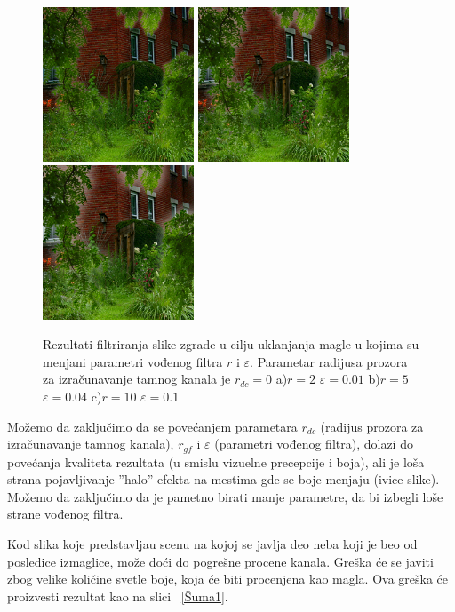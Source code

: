 \documentclass[a4paper,12pt,titlepage]{article}
\begin{document}
\begin{figure}[ht!]
\centering
\includegraphics[width=45mm]{img/hazeResGF2_01.png}
\includegraphics[width=45mm]{img/hazeResGF5_04.png}
\includegraphics[width=45mm]{img/hazeResGF10_1.png}
\caption{Rezultati filtriranja slike zgrade u cilju uklanjanja magle u kojima su menjani parametri vođenog filtra $r$ i $\varepsilon$. Parametar radijusa prozora  za izračunavanje tamnog kanala je $r_{dc} = 0$ a)$r = 2$ $\varepsilon = 0.01$ b)$r = 5$ $\varepsilon = 0.04$ c)$r = 10$ $\varepsilon = 0.1$}
\label{UticajRdc}
\end{figure} 

Možemo da zaključimo da se povećanjem parametara $r_{dc}$ (radijus prozora za izračunavanje tamnog kanala), $r_{gf}$ i $\varepsilon$ (parametri vođenog filtra), dolazi do povećanja kvaliteta rezultata (u smislu vizuelne precepcije i boja), ali je loša strana pojavljivanje ''halo'' efekta na mestima gde se boje menjaju (ivice slike). Možemo da zaključimo da je pametno birati manje parametre, da bi izbegli loše strane vođenog filtra.

Kod slika koje predstavljau scenu na kojoj se javlja deo neba koji je beo od posledice izmaglice, može doći do pogrešne procene kanala. Greška će se javiti zbog velike količine svetle boje, koja će biti procenjena kao magla. Ova greška će proizvesti rezultat kao na slici ~\ref{Šuma1}.
\end{document}

